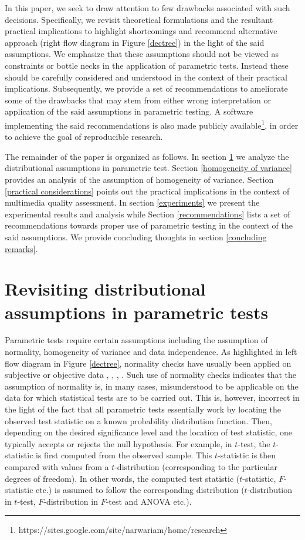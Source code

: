 \documentclass[10pt,final,Twcolumn]{IEEEtran}
\begin{document}
In this paper, we seek to draw attention to few drawbacks associated with such decisions. Specifically, we revisit theoretical formulations and the resultant practical implications to highlight shortcomings and recommend alternative approach (right flow diagram in Figure \ref{dectree}) in the light of the said assumptions. We emphasize that these assumptions should not be viewed as constraints or bottle necks in the application of parametric tests. Instead these should be carefully considered and understood in the context of their practical implications. Subsequently, we provide a set of recommendations to ameliorate some of the drawbacks that may stem from either wrong interpretation or application of the said assumptions in parametric testing. A software implementing the said recommendations is also made publicly available\footnote{https://sites.google.com/site/narwariam/home/research}, in order to achieve the goal of reproducible research.

The remainder of the paper is organized as follows. In section \ref{assumption of normality} we analyze the distributional assumptions in parametric test. Section \ref{homogeneity of variance} provides an analysis of the assumption of homogeneity of variance. Section \ref{practical considerations} points out the practical implications in the context of multimedia quality assessment. In section \ref{experiments} we present the experimental results and analysis while Section \ref{recommendations} lists a set of recommendations towards proper use of parametric testing in the context of the said assumptions. We provide concluding thoughts in section \ref{concluding remarks}.


\section{Revisiting distributional assumptions in parametric tests} \label{assumption of normality}

Parametric tests require certain assumptions including the assumption of normality, homogeneity of variance and data independence. As highlighted in left flow diagram in Figure \ref{dectree}, normality checks have usually been applied on subjective or objective data \cite{ITURBS1534}, \cite{ITUtutorial}, \cite{7254155}, \cite{P1401}. Such use of normality checks indicates that the assumption of normality is, in many cases, misunderstood to be applicable on the data for which statistical tests are to be carried out. This is, however, incorrect in the light of the fact that all parametric tests essentially work by locating the observed test statistic on a known probability distribution function. Then, depending on the desired significance level and the location of test statistic, one typically accepts or rejects the null hypothesis. For example, in $t$-test, the $t$-statistic is first computed from the observed sample. This $t$-statistic is then compared with values from a $t$-distribution (corresponding to the particular degrees of freedom).  In other words, the computed test statistic ($t$-statistic, $F$-statistic etc.) is assumed to follow the corresponding distribution ($t$-distribution in $t$-test, $F$-distribution in $F$-test and ANOVA etc.). 
\end{document}
